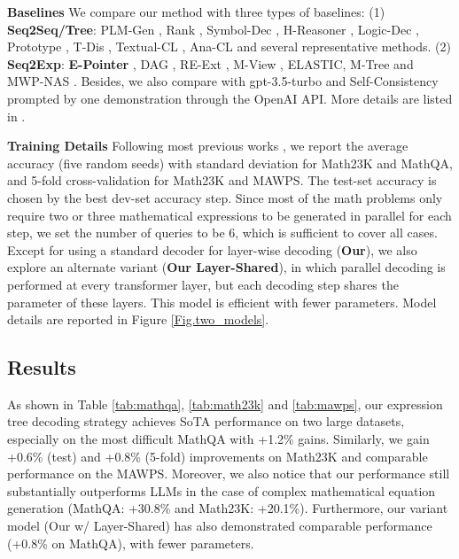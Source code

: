 \documentclass[11pt]{article}
\begin{document}
\textbf{Baselines} We compare our method with three types of baselines: (1) \textbf{Seq2Seq/Tree}: PLM-Gen \citep{lan2021mwptoolkit}, Rank \citep{shen-etal-2021-generate-rank}, Symbol-Dec \citep{qin-etal-2021-neural}, H-Reasoner \citep{yu-etal-2021-improving}, Logic-Dec \citep{yang2022logicsolver}, Prototype \citep{li2021seeking}, T-Dis \citep{ijcai2021-485}, Textual-CL \citep{shen2022textual}, Ana-CL \citep{liang-etal-2022-analogical} and several representative methods. (2) \textbf{Seq2Exp}: \textbf{E-Pointer} \citep{kim-etal-2020-point}, DAG \citep{cao2021bottom}, RE-Ext \citep{jie-etal-2022-learning}, M-View \citep{zhang-etal-2022-multi-view}, ELASTIC\citep{zhang2022elastic}, M-Tree \citep{wang2022structure} and  MWP-NAS \citep{DBLP:journals/corr/abs-2305-04556}. Besides, we also compare with gpt-3.5-turbo \citep{Chatgpt} and Self-Consistency \citep{wang2022self} prompted by one demonstration through the OpenAI API. More details are listed in .





\textbf{Training Details} Following most previous works \citep{zhang-etal-2022-multi-view,jie-etal-2022-learning}, we report the average accuracy (five random seeds) with standard deviation for Math23K and MathQA, and 5-fold cross-validation for Math23K and MAWPS. The test-set accuracy is chosen by the best dev-set accuracy step. Since most of the math problems only require two or three mathematical expressions to be generated in parallel for each step, we set the number of queries  to be 6, which is sufficient to cover all cases. Except for using a standard decoder for layer-wise decoding (\textbf{Our}), we also explore an alternate variant (\textbf{Our Layer-Shared}), in which parallel decoding is performed at every  transformer layer, but each decoding step shares the parameter of these  layers. This model is efficient with fewer parameters. Model details are reported in Figure \ref{Fig.two_models}.





\subsection{Results}
As shown in Table \ref{tab:mathqa}, \ref{tab:math23k} and \ref{tab:mawps}, our expression tree decoding strategy achieves SoTA performance on two large datasets, especially on the most difficult MathQA with +1.2\% gains. Similarly, we gain +0.6\% (test) and +0.8\% (5-fold) improvements on Math23K and comparable performance on the MAWPS. Moreover, we also notice that our performance still substantially outperforms LLMs in the case of complex mathematical equation generation (MathQA: +30.8\% and Math23K: +20.1\%). Furthermore, our variant model (Our w/ Layer-Shared) has also demonstrated comparable performance (+0.8\% on MathQA), with fewer parameters.
\end{document}
